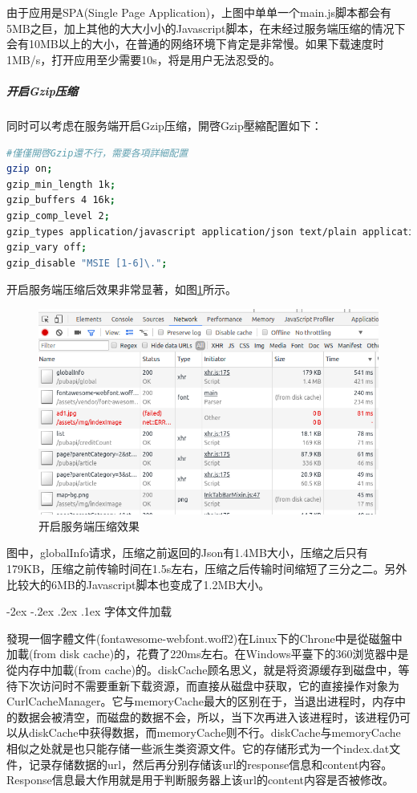 \documentclass[12pt]{book}
\makeatletter
\numberwithin{dummy}{section}
\theoremstyle{ocrenumbox}
\theoremstyle{blacknumex}
\theoremstyle{blacknumbox}
\theoremstyle{ocrenum}
\renewcommand\paragraph{\@startsection{paragraph}{4}{\z@}
	{-2ex \@plus-.2ex \@minus .2ex}
	{.1ex}
	{\normalfont\small\sffamily\bfseries}}
\newlength\esp
\makeatother
\begin{document}
由于应用是SPA(Single Page Application)，上图中单单一个main.js脚本都会有5MB之巨，加上其他的大大小小的Javascript脚本，在未经过服务端压缩的情况下会有10MB以上的大小，在普通的网络环境下肯定是非常慢。如果下载速度时1MB/s，打开应用至少需要10s，将是用户无法忍受的。

\subparagraph{开启Gzip压缩}

同时可以考虑在服务端开启Gzip压缩，開啓Gzip壓縮配置如下：

\begin{lstlisting}[language=Bash]
#僅僅開啓Gzip還不行，需要各項詳細配置
gzip on;
gzip_min_length 1k;
gzip_buffers 4 16k;
gzip_comp_level 2;
gzip_types application/javascript application/json text/plain application/x-javascript text/css application/xml text/javascript application/x-httpd-php image/jpeg image/gif image/png;
gzip_vary off;
gzip_disable "MSIE [1-6]\.";
\end{lstlisting}

开启服务端压缩后效果非常显著，如图\ref{fig:openservercompress}所示。

\begin{figure}[htbp]
	\centering
	\includegraphics[scale=0.5]{openservercompress.png}
	\caption{开启服务端压缩效果}
	\label{fig:openservercompress}
\end{figure}

图中，globalInfo请求，压缩之前返回的Json有1.4MB大小，压缩之后只有179KB，压缩之前传输时间在1.5s左右，压缩之后传输时间缩短了三分之二。另外比较大的6MB的Javascript脚本也变成了1.2MB大小。

\paragraph{字体文件加载}

發現一個字體文件(fontawesome-webfont.woff2)在Linux下的Chrone中是從磁盤中加載(from disk cache)的，花費了220ms左右。在Windows平臺下的360浏览器中是從内存中加載(from cache)的。diskCache顾名思义，就是将资源缓存到磁盘中，等待下次访问时不需要重新下载资源，而直接从磁盘中获取，它的直接操作对象为CurlCacheManager。它与memoryCache最大的区别在于，当退出进程时，内存中的数据会被清空，而磁盘的数据不会，所以，当下次再进入该进程时，该进程仍可以从diskCache中获得数据，而memoryCache则不行。diskCache与memoryCache相似之处就是也只能存储一些派生类资源文件。它的存储形式为一个index.dat文件，记录存储数据的url，然后再分别存储该url的response信息和content内容。Response信息最大作用就是用于判断服务器上该url的content内容是否被修改。
\end{document}
